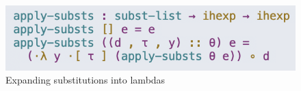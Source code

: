 \begin{figure}[ht]
	\includegraphics[scale=0.75,valign=t]{imgs/agda-substitutions.png}
	\caption{Expanding substitutions into lambdas}
	\label{fig:agda-substitutions}
\end{figure}